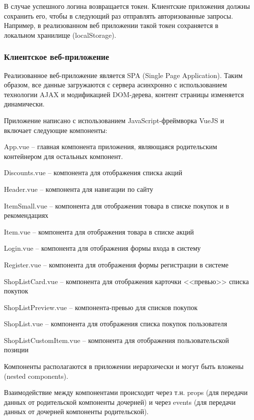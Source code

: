 В случае успешного логина возвращается токен. Клиентские приложения должны
сохранить его, чтобы в следующий раз отправлять авторизованные запросы.
Например, в реализованном веб приложении такой токен сохраняется в локальном хранилище
(localStorage). \cite{localstorage}

\subsubsection{Клиентское веб-приложение}
Реализованное веб-приложение является SPA (Single Page Application).
Таким образом, все данные загружаются с сервера асинхронно с использованием
технологии AJAX и модификацией DOM-дерева, контент страницы изменяется
динамически.

Приложение написано с использованием JavaScript-фреймворка VueJS и включает
следующие компоненты: 
\begin{my_enumerate}
  \item App.vue -- главная компонента приложения, являющаяся родительским
    контейнером для остальных компонент.
  \item Discounts.vue -- компонента для отображения списка акций
  \item Header.vue -- компонента для навигации по сайту
  \item ItemSmall.vue -- компонента для отображения товара в списке покупок и в
    рекомендациях
  \item Item.vue --  компонента для отображения товара в списке акций
  \item Login.vue -- компонента для отображения формы входа в систему
  \item Register.vue -- компонента для отображения формы регистрации в системе
  \item ShopListCard.vue -- компонента для отображения карточки <<превью>>
    списка покупок
  \item ShopListPreview.vue -- компонента-превью для списков покупок
  \item ShopList.vue -- компонента для отображения списка покупок пользователя
  \item ShopListCustomItem.vue -- компонента для отображения пользовательской
    позиции
\end{my_enumerate}
Компоненты располагаются в приложении иерархически и могут быть вложены (nested
components). \cite{vue}

Взаимодействие между компонентами происходит через т.н. props (для передачи
данных от родительской компоненты дочерней) и через events (для передачи данных
от дочерней компоненты родительской). \cite{vue}

